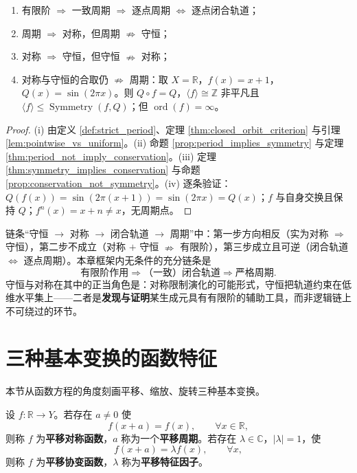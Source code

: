 \begin{corollary}[周期、对称、守恒的真实逻辑图]\label{cor:true_logic}
\begin{enumerate}[label=(\roman*)]
    \item 有限阶 $\Rightarrow$ 一致周期 $\Rightarrow$ 逐点周期 $\iff$ 逐点闭合轨道；
    \item 周期 $\Rightarrow$ 对称，但周期 $\nRightarrow$ 守恒；
    \item 对称 $\Rightarrow$ 守恒，但守恒 $\nRightarrow$ 对称；
    \item 对称与守恒的合取仍 $\nRightarrow$ 周期：取 $X=\mathbb{R}$，$f(x)=x+1$，$Q(x)=\sin(2\pi x)$。则 $Q\circ f=Q$，$\langle f\rangle\cong\mathbb{Z}$ 非平凡且 $\langle f\rangle\le\operatorname{Symmetry}(f,Q)$；但 $\operatorname{ord}(f)=\infty$。
\end{enumerate}
\end{corollary}

\begin{proof}
(i) 由定义 \ref{def:strict_period}、定理 \ref{thm:closed_orbit_criterion} 与引理 \ref{lem:pointwise_vs_uniform}。(ii) 命题 \ref{prop:period_implies_symmetry} 与定理 \ref{thm:period_not_imply_conservation}。(iii) 定理 \ref{thm:symmetry_implies_conservation} 与命题 \ref{prop:conservation_not_symmetry}。(iv) 逐条验证：$Q(f(x))=\sin(2\pi(x+1))=\sin(2\pi x)=Q(x)$；$f$ 与自身交换且保持 $Q$；$f^n(x)=x+n\neq x$，无周期点。
\end{proof}

\begin{remark}[主链条的逻辑结构]\label{rem:chain_verdict}
链条“守恒 $\to$ 对称 $\to$ 闭合轨道 $\to$ 周期”中：第一步方向相反（实为对称 $\Rightarrow$ 守恒），第二步不成立（对称 $+$ 守恒 $\nRightarrow$ 有限阶），第三步成立且可逆（闭合轨道 $\iff$ 逐点周期）。本章框架内无条件的充分链条是
\[
\text{有限阶作用}\Longrightarrow\text{（一致）闭合轨道}\Longrightarrow\text{严格周期}.
\]
守恒与对称在其中的正当角色是：对称限制演化的可能形式，守恒把轨道约束在低维水平集上——二者是\textbf{发现与证明}某生成元具有有限阶的辅助工具，而非逻辑链上不可绕过的环节。
\end{remark}

\section{三种基本变换的函数特征}
\label{sec:function_features_transformations}

本节从函数方程的角度刻画平移、缩放、旋转三种基本变换。

\begin{definition}[平移对称函数与平移协变函数]\label{def:translation_symmetric_function}
设 $f:\mathbb{R}\to Y$。若存在 $a\neq 0$ 使
\[
f(x+a)=f(x),\qquad \forall x\in\mathbb{R},
\]
则称 $f$ 为\textbf{平移对称函数}，$a$ 称为一个\textbf{平移周期}。若存在 $\lambda\in\mathbb{C}$，$|\lambda|=1$，使
\[
f(x+a)=\lambda f(x),\qquad \forall x,
\]
则称 $f$ 为\textbf{平移协变函数}，$\lambda$ 称为\textbf{平移特征因子}。
\end{definition}

